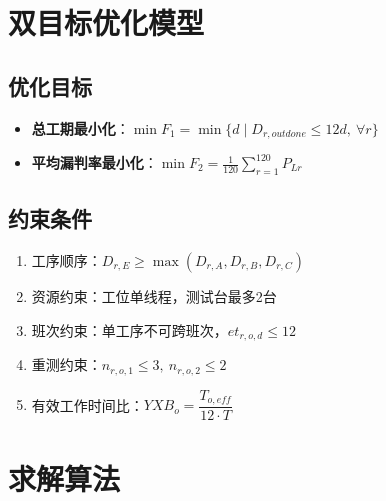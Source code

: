 \documentclass{article}
\begin{document}
\section{双目标优化模型}

\subsection{优化目标}
\begin{itemize}
    \item \textbf{总工期最小化}：\(\min F_1 = \min\{d \mid D_{r,outdone} \leq 12d,\ \forall r\}\)
    \item \textbf{平均漏判率最小化}：\(\min F_2 = \frac{1}{120}\sum_{r=1}^{120} P_{Lr}\)
\end{itemize}

\subsection{约束条件}
\begin{enumerate}
    \item 工序顺序：\(D_{r,E} \geq \max(D_{r,A}, D_{r,B}, D_{r,C})\)
    \item 资源约束：工位单线程，测试台最多2台
    \item 班次约束：单工序不可跨班次，\(et_{r,o,d} \leq 12\)
    \item 重测约束：\(n_{r,o,1} \leq 3,\ n_{r,o,2} \leq 2\)
    \item 有效工作时间比：\(YXB_o = \dfrac{T_{o,eff}}{12 \cdot T}\)
\end{enumerate}

\section{求解算法}
\end{document}
